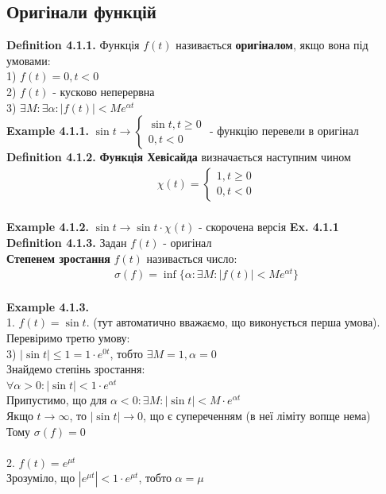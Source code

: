 \documentclass[a4paper, 10pt]{article}
\def\hugespace{\vspace{5mm} \\}
\theoremstyle{theoremdd}
\theoremstyle{theoremdd}
\theoremstyle{theoremdd}
\theoremstyle{theoremdd}
\theoremstyle{theoremdd}
\theoremstyle{theoremdd}
\theoremstyle{theoremdd}
\theoremstyle{theoremdd}
\begin{document}
\subsection{Оригінали функцій}
\textbf{Definition 4.1.1.} Функція $f(t)$ називається \textbf{оригіналом}, якщо вона під умовами:\\
1) $f(t) = 0, t<0$\\
2) $f(t)$ - кусково неперервна\\
3) $\exists M: \exists \alpha: |f(t)|<Me^{\alpha t}$
\hugespace
\textbf{Example 4.1.1.} $\sin t \to \begin{cases} \sin t, t \geq 0 \\ 0, t < 0 \end{cases}$ - функцію перевели в оригінал
\hugespace
\textbf{Definition 4.1.2.} \textbf{Функція Хевісайда} визначається наступним чином
\begin{align*}
\chi(t) = \begin{cases} 1, t \geq 0 \\ 0, t < 0 \end{cases}
\end{align*}
\\
\textbf{Example 4.1.2.} $\sin t \to \sin t \cdot \chi(t)$ - скорочена версія \textbf{Ex. 4.1.1}
\hugespace
\textbf{Definition 4.1.3.} Задан $f(t)$ - оригінал\\
\textbf{Степенем зростання} $f(t)$ називається число:
\begin{align*}
\sigma(f) = \inf\{\alpha: \exists M: |f(t)| < Me^{\alpha t}\}
\end{align*}
\\
\textbf{Example 4.1.3.}\\
1. $f(t) = \sin t$. (тут автоматично вважаємо, що виконується перша умова). Перевіримо третю умову:\\
3) $|\sin t| \leq 1 = 1 \cdot e^{0t}$, тобто $\exists M=1, \alpha = 0$\\
Знайдемо степінь зростання:\\
$\forall \alpha > 0: |\sin t| < 1\cdot e^{\alpha t}$\\
Припустимо, що для $\alpha < 0: \exists M: |\sin t| < M\cdot e^{\alpha t}$\\
Якщо $t \to \infty$, то $|\sin t| \to 0$, що є супереченням (в неї ліміту вопще нема)\\
Тому $\sigma(f) = 0$\\
\\
2. $f(t) = e^{\mu t}$\\
Зрозуміло, що $|e^{\mu t}| < 1\cdot e^{\mu t}$, тобто $\alpha = \mu$\\
\end{document}
